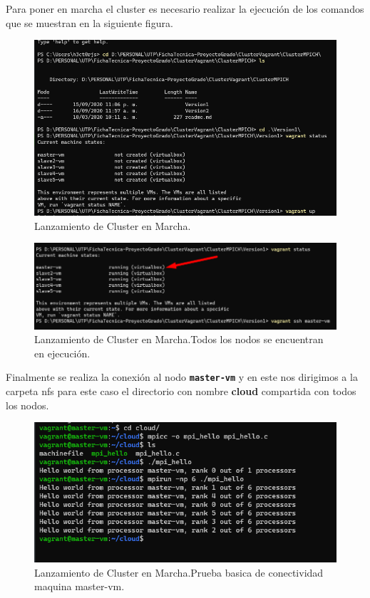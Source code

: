 \documentclass[letterpaper, 12pt, oneside]{article}
\begin{document}
    Para poner en marcha el cluster es necesario realizar la ejecución de los comandos que se muestran en la siguiente figura. 
    
    \begin{figure}[H]\centering
            \includegraphics[scale=1.4]{img/provision/version1fin.png}
            \caption{Lanzamiento de Cluster en Marcha.}
            \label{fig:checkcluster1}
    \end{figure}
    
    \begin{figure}[H] \centering
            \includegraphics[scale=1.3]{img/provision/version1fin2.png}
            \caption{Lanzamiento de Cluster en Marcha.Todos los nodos se encuentran en ejecución.}
            \label{fig:checkcluster2}
    \end{figure}
    Finalmente se realiza la conexión al nodo \texttt{\textbf{master-vm}} y en este nos dirigimos a la carpeta nfs para este caso el directorio con nombre \textbf{cloud} compartida con todos los nodos.
    
    \begin{figure}[H] \centering
            \includegraphics[scale=1.4]{img/provision/version1fin3.png}
            \caption{Lanzamiento de Cluster en Marcha.Prueba basica de conectividad maquina master-vm.}
            \label{fig:checkcluster2}
    \end{figure}
    
\end{document}
